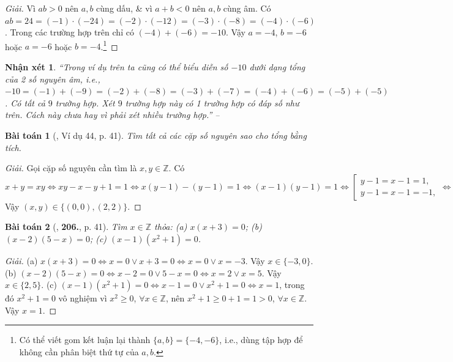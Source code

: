 \documentclass{article}
\numberwithin{equation}{section}
\newtheorem{baitoan}{Bài toán}
\newtheorem{nhanxet}{Nhận xét}[section]
\begin{document}
\begin{proof}[Giải]
	Vì $ab > 0$ nên $a,b$ cùng dấu, \& vì $a + b < 0$ nên $a,b$ cùng âm. Có $ab = 24 = (-1)\cdot(-24) = (-2)\cdot(-12) = (-3)\cdot(-8) = (-4)\cdot(-6)$. Trong các trường hợp trên chỉ có $(-4) + (-6) = -10$. Vậy $a = -4$, $b = -6$ hoặc $a = -6$ hoặc $b = -4$.\footnote{Có thể viết gom kết luận lại thành $\{a,b\} = \{-4,-6\}$, i.e., dùng tập hợp để không cần phân biệt thứ tự của $a,b$.}
\end{proof}

\begin{nhanxet}
	``Trong ví dụ trên ta cũng có thể biểu diễn số $-10$ dưới dạng tổng của 2 số nguyên âm, i.e., $-10 = (-1) + (-9) = (-2) + (-8) = (-3) + (-7) = (-4) + (-6) = (-5) + (-5)$. Có tất cả $9$ trường hợp. Xét $9$ trường hợp này có 1 trường hợp có đáp số như trên. Cách này chưa hay vì phải xét nhiều trường hợp.'' -- \cite[p. 41]{Tuyen_Toan_6}
\end{nhanxet}

\begin{baitoan}[\cite{Tuyen_Toan_6}, Ví dụ 44, p. 41]
	Tìm tất cả các cặp số nguyên sao cho tổng bằng tích.
\end{baitoan}

\begin{proof}[Giải]
	Gọi cặp số nguyên cần tìm là $x,y\in\mathbb{Z}$. Có
	\begin{equation*}
		x + y = xy\Leftrightarrow xy - x - y + 1 = 1\Leftrightarrow x(y - 1) - (y - 1) = 1\Leftrightarrow(x - 1)(y - 1) = 1\Leftrightarrow\left[\begin{split}
			y - 1 = x - 1 = 1,\\
			y - 1 = x - 1 = -1,
		\end{split}\right.\Leftrightarrow\left[\begin{split}
			x = y = 2,\\
			x = y = 0.
	\end{split}\right.
	\end{equation*}
	Vậy $(x,y)\in\{(0,0),(2,2)\}$.
\end{proof}

\begin{baitoan}[\cite{Tuyen_Toan_6}, \textbf{206.}, p. 41]
	Tìm $x\in\mathbb{Z}$ thỏa: (a) $x(x + 3) = 0$; (b) $(x - 2)(5 - x) = 0$; (c) $(x - 1)(x^2 + 1) = 0$.
\end{baitoan}

\begin{proof}[Giải]
	(a) $x(x + 3) = 0\Leftrightarrow x = 0\lor x + 3 = 0\Leftrightarrow x = 0\lor x = -3$. Vậy $x\in\{-3,0\}$. (b) $(x - 2)(5 - x) = 0\Leftrightarrow x - 2 = 0\lor5 - x = 0\Leftrightarrow x = 2\lor x = 5$. Vậy $x\in\{2,5\}$. (c) $(x - 1)(x^2 + 1) = 0\Leftrightarrow x - 1 = 0\lor x^2 + 1 = 0\Leftrightarrow x = 1$, trong đó $x^2 + 1 = 0$ vô nghiệm vì $x^2\ge 0$, $\forall x\in\mathbb{Z}$, nên $x^2 + 1\ge0 + 1 = 1 > 0$, $\forall x\in\mathbb{Z}$. Vậy $x = 1$.
\end{proof}
\end{document}
